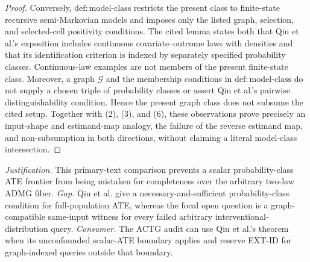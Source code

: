 \documentclass{article}
\begin{document}
\begin{proof}
Conversely, \(\mathrm{def:model\text{-}class}\) restricts the present class to finite-state recursive semi-Markovian models and imposes only the listed graph, selection, and selected-cell positivity conditions.  The cited lemma states both that Qiu et al.'s exposition includes continuous covariate--outcome laws with densities and that its identification criterion is indexed by separately specified probability classes.  Continuous-law examples are not members of the present finite-state class.  Moreover, a graph \(\mathcal G\) and the membership conditions in \(\mathrm{def:model\text{-}class}\) do not supply a chosen triple of probability classes or assert Qiu et al.'s pairwise distinguishability condition.  Hence the present graph class does not subsume the cited setup.  Together with (2), (3), and (6), these observations prove precisely an input-shape and estimand-map analogy, the failure of the reverse estimand map, and non-subsumption in both directions, without claiming a literal model-class intersection.
\end{proof}
\par\smallskip\noindent \textit{Justification.} This primary-text comparison prevents a scalar probability-class ATE frontier from being mistaken for completeness over the arbitrary two-law ADMG fiber. \textit{Gap.} Qiu et al. give a necessary-and-sufficient probability-class condition for full-population ATE, whereas the focal open question is a graph-compatible same-input witness for every failed arbitrary interventional-distribution query. \textit{Consumer.} The ACTG audit can use Qiu et al.'s theorem when its unconfounded scalar-ATE boundary applies and reserve EXT-ID for graph-indexed queries outside that boundary.
\end{document}

